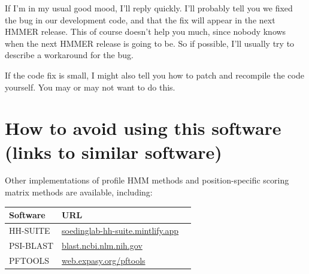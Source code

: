 If I'm in my usual good mood, I'll reply quickly.  I'll probably
tell you we fixed the bug in our development code, and that the fix
will appear in the next HMMER release. This of course doesn't help you
much, since nobody knows when the next HMMER release is going to be.
So if possible, I'll usually try to describe a workaround for the
bug.

If the code fix is small, I might also tell you how to patch and
recompile the code yourself. You may or may not want to do this.







\section{How to avoid using this software (links to similar software)}

Other implementations of profile HMM methods and position-specific
scoring matrix methods are available, including:

\begin{center}
\begin{tabular}{lp{5in}l}
Software  &   URL \\ \hline
HH-SUITE  & \href{https://soedinglab-hh-suite.mintlify.app/}{soedinglab-hh-suite.mintlify.app}\\
PSI-BLAST & \href{https://blast.ncbi.nlm.nih.gov/}{blast.ncbi.nlm.nih.gov}\\
PFTOOLS   & \href{http://web.expasy.org/pftools/}{web.expasy.org/pftools}\\
\end{tabular}
\end{center}





  









